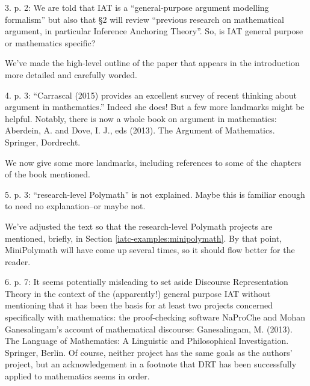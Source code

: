 \begin{mdframed}[backgroundcolor=orange!10]
3. p. 2: We are told that IAT is a ``general-purpose argument modelling formalism'' but also that §2 will review ``previous research on mathematical argument, in particular Inference Anchoring Theory''. So, is IAT general purpose or mathematics specific?
\end{mdframed}

We've made the high-level outline of the paper that appears in the
introduction more detailed and carefully worded.

\begin{mdframed}[backgroundcolor=orange!10]
4. p. 3: ``Carrascal (2015) provides an excellent survey of recent thinking about argument in mathematics.'' Indeed she does! But a few more landmarks might be helpful. Notably, there is now a whole book on argument in mathematics: Aberdein, A. and Dove, I. J., eds (2013). The Argument of Mathematics. Springer, Dordrecht.
\end{mdframed}

We now give some more landmarks, including references to some of the
chapters of the book mentioned.

\begin{mdframed}[backgroundcolor=orange!10]
5. p. 3: ``research-level Polymath'' is not explained. Maybe this is familiar enough to need no explanation--or maybe not.
\end{mdframed}

We've adjusted the text so that the
research-level Polymath projects are mentioned, briefly, in Section \ref{iatc-examples:minipolymath}.
By that point, MiniPolymath will have come up several times, so it should flow better for the reader.

\begin{mdframed}[backgroundcolor=red!10]
6. p. 7: It seems potentially misleading to set aside Discourse Representation Theory in the context of the (apparently!) general purpose IAT without mentioning that it has been the basis for at least two projects concerned specifically with mathematics: the proof-checking software NaProChe and Mohan Ganesalingam's account of mathematical discourse: Ganesalingam, M. (2013). The Language of Mathematics: A Linguistic and Philosophical Investigation. Springer, Berlin. Of course, neither project has the same goals as the authors' project, but an acknowledgement in a footnote that DRT has been successfully applied to mathematics seems in order.
\end{mdframed}

